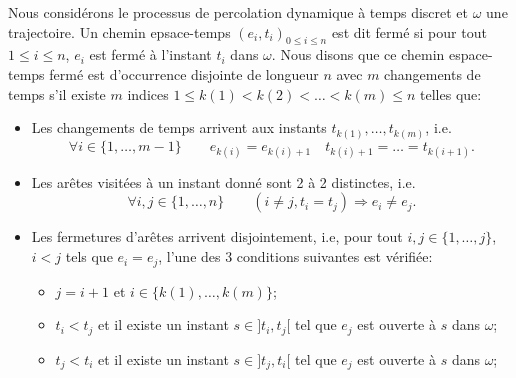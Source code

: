 \documentclass[titlepage,a4paper,12pt]{article}
\newcounter{d}
\newcounter{t}
\newcounter{p}
\newcounter{c}
\newcounter{a}
\newcounter{l}
\begin{document}
Nous considérons le processus de percolation dynamique à temps discret et $\omega$ une trajectoire. Un chemin epsace-temps $(e_i,t_i)_{0\leqslant i \leqslant n}$ est dit fermé si pour tout $1\leqslant i\leqslant n$, $e_i$ est fermé à l'instant $t_i$ dans $\omega$. Nous disons que ce chemin espace-temps fermé est d'occurrence disjointe de longueur $n$ avec $m$ changements de temps s'il existe $m$ indices $1\leqslant k(1)< k(2) < \dots < k(m) \leqslant n$ telles que:
\begin{itemize}[label = $\bullet$, leftmargin = *]
\item Les changements de temps arrivent aux instants $t_{k(1)},\dots, t_{k(m)}$, i.e.
$$\forall i\in \{1,\dots, m-1\} \qquad e_{k(i)} = e_{k(i)+1} \quad t_{k(i)+1} =\dots = t_{k(i+1)}.
$$
\item Les arêtes visitées à un instant donné sont 2 à 2 distinctes, i.e.
$$ \forall i,j \in \{1,\dots, n\} \qquad (i\neq j, t_i = t_j) \Rightarrow e_i\neq e_j.
$$
\item Les fermetures d'arêtes arrivent disjointement, i.e, pour tout $i,j\in \{1,\dots, j\}$, $i<j$ tels que $e_i = e_j$, l'une des 3 conditions suivantes est vérifiée:
\begin{itemize}[label=$\bullet$]
\item $j=i+1$ et $i\in \{k(1),\dots, k(m)\}$;
\item $t_i< t_j$ et il existe un instant $s\in ]t_i,t_j[$ tel que $e_j$ est ouverte à $s$ dans $\omega$;
\item $t_j< t_i$ et il existe un instant $s\in ]t_j,t_i[$ tel que $e_j$ est ouverte à $s$ dans $\omega$;
\end{itemize}
\end{itemize}
\end{document}
